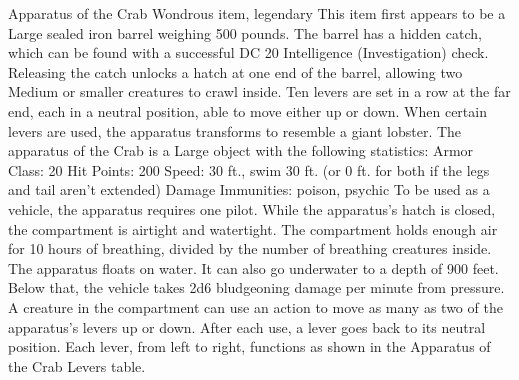 

Apparatus of the Crab
Wondrous item, legendary This item first appears to be a Large sealed iron barrel weighing 500 pounds. The barrel has a hidden catch, which can be found with a successful DC 20 Intelligence (Investigation) check. Releasing the catch unlocks a hatch at one end of the barrel, allowing two Medium or smaller creatures to crawl inside. Ten levers are set in a row at the far end, each in a neutral position, able to move either up or down. When certain levers are used, the apparatus transforms to resemble a giant lobster.  The apparatus of the Crab is a Large object with the following statistics:
Armor Class: 20
Hit Points: 200
Speed: 30 ft., swim 30 ft. (or 0 ft. for both if the legs and tail aren't extended)
Damage Immunities: poison, psychic To be used as a vehicle, the apparatus requires one pilot. While the apparatus's hatch is closed, the compartment is airtight and watertight. The compartment holds enough air for 10 hours of breathing, divided by the number of breathing creatures inside.  The apparatus floats on water. It can also go underwater to a depth of 900 feet. Below that, the vehicle takes 2d6 bludgeoning damage per minute from pressure.  A creature in the compartment can use an action to move as many as two of the apparatus's levers up or down. After each use, a lever goes back to its neutral position. Each lever, from left to right, functions as shown in the Apparatus of the Crab Levers table.


